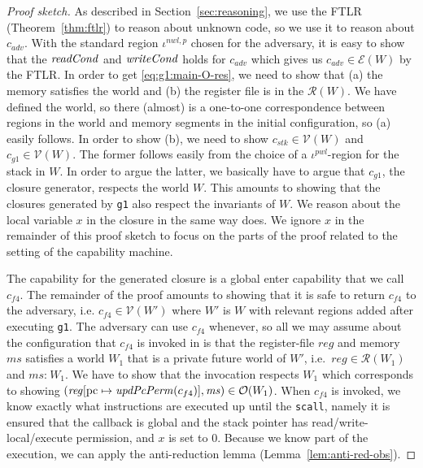 \documentclass[format=acmsmall, review=true, screen=true]{acmart}
\renewcommand{\sectionname}{Section}
\newcommand{\var}[1]{\mathit{#1}}
\newcommand{\hs}{\var{ms}}
\newcommand{\ms}{\hs}
\newcommand{\pcreg}{\mathrm{pc}}
\newcommand{\reg}{\var{reg}}
\newcommand{\heap}{\var{mem}}
\newcommand{\adv}{\var{adv}}
\newcommand{\stk}{\var{stk}}
\newcommand{\plainfun}[2]{
  \ifthenelse{\equal{#2}{}}
  {\mathit{#1}}
  {\mathit{#1}(#2)}
}
\newcommand{\updatePcPerm}[1]{\plainfun{updPcPerm}{#1}}
\newcommand{\readCond}[1]{\plainfun{readCond}{#1}}
\newcommand{\writeCond}[1]{\plainfun{writeCond}{#1}}
\newcommand{\heapSat}[3][\heap]{#1 :_{#2} #3}
\newcommand{\memSat}[3][n]{\heapSat[#2]{#1}{#3}}
\newcommand{\asmType}{\plaindom{AsmType}}
\newcommand{\plaindom}[1]{\mathrm{#1}}
\newcommand{\intr}[2]{\mathcal{#1}}
\newcommand{\valueintr}[1]{\intr{V}{#1}}
\newcommand{\exprintr}[1]{\intr{E}{#1}}
\newcommand{\regintr}[1]{\intr{R}{#1}}
\newcommand{\stdvr}{\valueintr{\asmType}}
\newcommand{\stder}{\exprintr{\asmType}}
\newcommand{\stdrr}{\regintr{\asmType}}
\newcommand{\observations}{\mathcal{O}}
\newenvironment{toplas}{}{}
\begin{document}
\begin{toplas}
\begin{proof}[Proof sketch]
  As described in \sectionname~\ref{sec:reasoning}, we use the FTLR (Theorem~\ref{thm:ftlr}) to reason about unknown code, so we use it to reason about $c_\adv$.
  With the standard region $\iota^{nwl,p}$ chosen for the adversary, it is easy to show that the $\readCond{}$ and $\writeCond{}$ holds for $c_\adv$ which gives us $c_\adv \in \stder(W)$ by the FTLR.
  In order to get \eqref{eq:g1:main-O-res}, we need to show that (a) the memory satisfies the world and (b) the register file is in the $\stdrr(W)$.
  We have defined the world, so there (almost) is a one-to-one correspondence between regions in the world and memory segments in the initial configuration, so (a) easily follows.
  In order to show (b), we need to show $c_\stk \in \stdvr(W)$ and $c_{g1} \in \stdvr(W)$.
  The former follows easily from the choice of a $\iota^{pwl}$-region for the stack in $W$.
  In order to argue the latter, we basically have to argue that $c_{g1}$, the closure generator, respects the world $W$.
  This amounts to showing that the closures generated by \texttt{g1} also respect the invariants of $W$.
  We reason about the local variable $x$ in the closure in the same way \citet{Dreyer:jfp12} does.
  We ignore $x$ in the remainder of this proof sketch to focus on the parts of the proof related to the setting of the capability machine.

  The capability for the generated closure is a global enter capability that we call $c_{f4}$.
  The remainder of the proof amounts to showing that it is safe to return $c_{f4}$ to the adversary, i.e.
  $c_{f4} \in \stdvr(W')$ where $W'$ is $W$ with relevant regions added after executing \texttt{g1}.
  The adversary can use $c_{f4}$ whenever, so all we may assume about the configuration that $c_{f4}$ is invoked in is that the register-file $\reg$ and memory $\ms$ satisfies a world $W_1$ that is a private future world of $W'$, i.e.\ $\reg \in \stdrr(W_1)$ and $\memSat[]{\ms}{W_1}$.
  We have to show that the invocation respects $W_1$ which corresponds to showing $(\reg[\pcreg \mapsto \updatePcPerm{c_{f4}}],\ms) \in \observations(W_1)$.
  When $c_{f4}$ is invoked, we know exactly what instructions are executed up until the \texttt{scall}, namely it is ensured that the callback is global and the stack pointer has read/write-local/execute permission, and $x$ is set to 0.
  Because we know part of the execution, we can apply the anti-reduction lemma (Lemma~\ref{lem:anti-red-obs}).
  

\end{proof}
\end{toplas}
\end{document}
